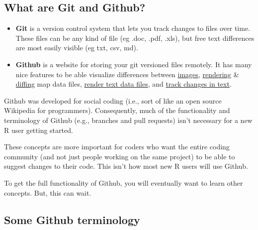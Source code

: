 \documentclass[]{book}
\begin{document}
\hypertarget{what-are-git-and-github}{%
\subsection{What are Git and Github?}\label{what-are-git-and-github}}

\begin{itemize}
\item
  \textbf{Git} is a version control system that lets you track changes to files over time. These files can be any kind of file (eg .doc, .pdf, .xls), but free text differences are most easily visible (eg txt, csv, md).
\item
  \textbf{Github} is a website for storing your git versioned files remotely. It has many nice features to be able visualize differences between \href{https://help.github.com/articles/rendering-and-diffing-images/}{images}, \href{https://help.github.com/articles/mapping-geojson-files-on-github/}{rendering} \& \href{https://github.com/blog/1772-diffable-more-customizable-maps}{diffing} map data files, \href{https://help.github.com/articles/rendering-csv-and-tsv-data/}{render text data files}, and \href{https://help.github.com/articles/rendering-differences-in-prose-documents/}{track changes in text}.
\end{itemize}

Github was developed for social coding (i.e., sort of like an open source Wikipedia for programmers). Consequently, much of the functionality and terminology of Github (e.g., branches and pull requests) isn't necessary for a new R user getting started.

These concepts are more important for coders who want the entire coding community (and not just people working on the same project) to be able to suggest changes to their code. This isn't how most new R users will use Github.

To get the full functionality of Github, you will eventually want to learn other concepts. But, this can wait.

\hypertarget{some-github-terminology}{%
\subsection{Some Github terminology}\label{some-github-terminology}}
\end{document}
